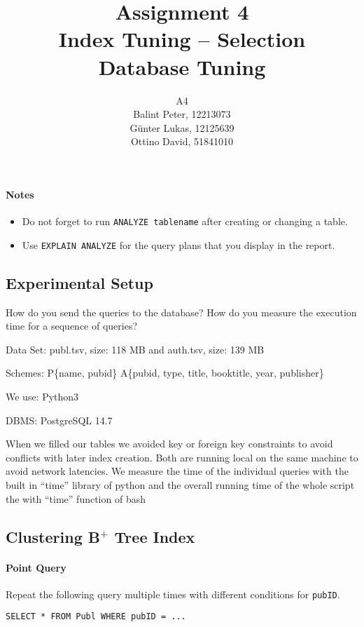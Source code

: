 \documentclass[11pt]{scrartcl}
\title{
  \textbf{\large Assignment 4} \\
  Index Tuning -- Selection \\
  {\large Database Tuning}}
\author{
  A4 \\
  \large Balint Peter, 12213073 \\
  \large Günter Lukas, 12125639 \\
  \large Ottino David, 51841010
}
\begin{document}
\maketitle

\paragraph{Notes}

\begin{itemize}
  \item Do not forget to run \lstinline[style=dbtsql]{ANALYZE tablename} after creating or changing a table.
  \item Use \lstinline[style=dbtsql]{EXPLAIN ANALYZE} for the query plans that you display in the report.
\end{itemize}

\subsection*{Experimental Setup}

How do you send the queries to the database? How do you measure the execution time for a sequence of queries?

Data Set: publ.tsv, size: 118 MB and auth.tsv, size: 139 MB

Schemes: P\{name, pubid\} A\{pubid, type, title, booktitle, year, publisher\}

We use: Python3

DBMS: PostgreSQL 14.7

When we filled our tables we avoided key or foreign key constraints to avoid conflicts with later index creation. Both are running local on the same machine to avoid network latencies. We measure the time of the individual queries with the built in “time” library of python and the overall running time of the whole script the with “time” function of bash

\subsection*{Clustering B$^+$ Tree Index}

\paragraph{Point Query}

Repeat the following query multiple times with different conditions for \texttt{pubID}.

\begin{lstlisting}[style=dbtsql]
SELECT * FROM Publ WHERE pubID = ...
\end{lstlisting}
\end{document}
